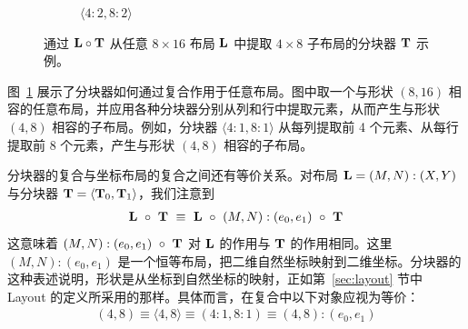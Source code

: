\begin{figure}[ht]
\begin{subfigure}{0.22\textwidth}
\centering
{}
\caption{$\langle 4:2,8:2 \rangle$}
\end{subfigure}
\caption{通过 $\mathbf{L} \circ \mathbf{T}$ 从任意 $8{\times}16$ 布局 $\mathbf{L}$ 中提取 $4 {\times} 8$ 子布局的分块器 $\mathbf{T}$ 示例。}
\label{fig:tilers}
\end{figure}

图~\ref{fig:tilers} 展示了分块器如何通过复合作用于任意布局。图中取一个与形状 $(8,16)$ 相容的任意布局，并应用各种分块器分别从列和行中提取元素，从而产生与形状 $(4,8)$ 相容的子布局。例如，分块器 $\langle 4:1, 8:1 \rangle$ 从每列提取前 4 个元素、从每行提取前 8 个元素，产生与形状 $(4,8)$ 相容的子布局。

分块器的复合与坐标布局的复合之间还有等价关系。对布局 $\mathbf{L} = (M,N) : (X,Y)$ 与分块器 $\mathbf{T} = \langle \mathbf{T}_0, \mathbf{T}_1 \rangle$，我们注意到
\begin{align*}
\mathbf{L} \ \circ \ \mathbf{T} \ \equiv \ \mathbf{L} \ \circ \ (M,N):(e_0,e_1) \ \circ \ \mathbf{T}
\end{align*}
这意味着 $(M,N):(e_0,e_1) \ \circ \ \mathbf{T}$ 对 $\mathbf{L}$ 的作用与 $\mathbf{T}$ 的作用相同。这里 $(M,N):(e_0,e_1)$ 是一个恒等布局，把二维自然坐标映射到二维坐标。分块器的这种表述说明，形状是从坐标到自然坐标的映射，正如第~\ref{sec:layout} 节中 Layout 的定义所采用的那样。具体而言，在复合中以下对象应视为等价：
\begin{align*}
(4,8) \equiv \langle 4, 8 \rangle \equiv (4:1, 8:1) \equiv (4,8):(e_0,e_1)
\end{align*}
